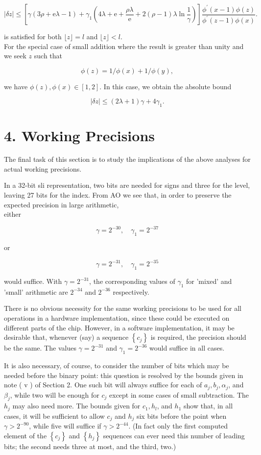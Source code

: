 \documentclass[10pt]{article}
\begin{document}
\begin{equation*}
|\delta z| \leqslant\left[\gamma(3 \rho+\mathrm{e} \lambda-1)+\gamma_{1}\left(4 \lambda+\mathrm{e}+\frac{\rho \lambda}{\mathrm{e}}+2(\rho-1) \lambda \ln \frac{1}{\gamma}\right)\right] \frac{\phi^{\prime}(x-1) \phi(z)}{\phi^{\prime}(z-1) \phi(x)} . \tag{3.9}
\end{equation*}


is satisfied for both $\lfloor z\rfloor=l$ and $\lfloor z\rfloor<l$.\\
For the special case of small addition where the result is greater than unity and we seek $z$ such that

$$
\phi(z)=1 / \phi(x)+1 / \phi(y),
$$

we have $\phi(z), \phi(x) \in[1,2]$. In this case, we obtain the absolute bound

$$
|\delta z| \leqslant(2 \lambda+1) \gamma+4 \gamma_{1} .
$$

\section*{4. Working Precisions}
The final task of this section is to study the implications of the above analyses for actual working precisions.

In a 32-bit sli representation, two bits are needed for signs and three for the level, leaving 27 bits for the index. From AO we see that, in order to preserve the expected precision in large arithmetic,\\
either

$$
\gamma=2^{-30}, \quad \gamma_{1}=2^{-37}
$$

or

$$
\gamma=2^{-31}, \quad \gamma_{1}=2^{-35}
$$

would suffice. With $\gamma=2^{-31}$, the corresponding values of $\gamma_{1}$ for 'mixed' and 'small' arithmetic are $2^{-34}$ and $2^{-36}$ respectively.

There is no obvious necessity for the same working precisions to be used for all\\
operations in a hardware implementation, since these could be executed on different parts of the chip. However, in a software implementation, it may be desirable that, whenever (say) a sequence $\left\{c_{j}\right\}$ is required, the precision should be the same. The values $\gamma=2^{-31}$ and $\gamma_{1}=2^{-36}$ would suffice in all cases.

It is also necessary, of course, to consider the number of bits which may be needed before the binary point: this question is resolved by the bounds given in note ( v ) of Section 2. One such bit will always suffice for each of $a_{j}, b_{j}, \alpha_{j}$, and $\beta_{j}$, while two will be enough for $c_{j}$ except in some cases of small subtraction. The $h_{j}$ may also need more. The bounds given for $c_{1}, h_{l}$, and $h_{1}$ show that, in all cases, it will be sufficient to allow $c_{j}$ and $h_{j}$ six bits before the point when $\gamma>2^{-90}$, while five will suffice if $\gamma>2^{-44}$. (In fact only the first computed element of the $\left\{c_{j}\right\}$ and $\left\{h_{j}\right\}$ sequences can ever need this number of leading bits; the second needs three at most, and the third, two.)
\end{document}

